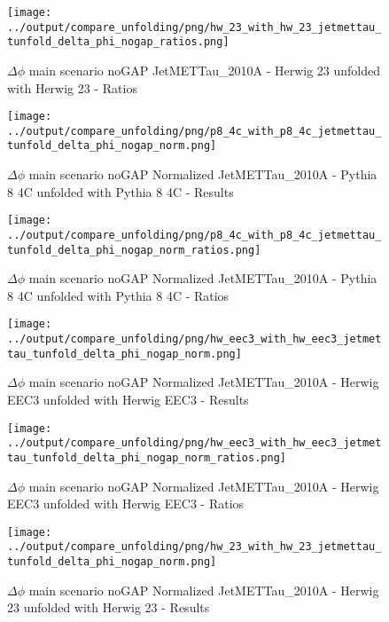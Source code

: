 \documentclass[11pt]{book}
\begin{document}
\begin{figure}[ht]
\centering
\texttt{[image: ../output/compare\_unfolding/png/hw\_23\_with\_hw\_23\_jetmettau\_tunfold\_delta\_phi\_nogap\_ratios.png]}
\caption{$\Delta\phi$ main scenario noGAP JetMETTau\_2010A - Herwig 23 unfolded with Herwig 23 - Ratios}
\label{hw_23_hw_23_jetmettau_tunfold_delta_phi_nogap_b}
\end{figure}



\begin{figure}[ht]
\centering
\texttt{[image: ../output/compare\_unfolding/png/p8\_4c\_with\_p8\_4c\_jetmettau\_tunfold\_delta\_phi\_nogap\_norm.png]}
\caption{$\Delta\phi$ main scenario noGAP Normalized JetMETTau\_2010A - Pythia 8 4C unfolded with Pythia 8 4C - Results}
\label{p8_p8_jetmettau_tunfold_delta_phi_nogap_norm_a}
\end{figure}

\begin{figure}[ht]
\centering
\texttt{[image: ../output/compare\_unfolding/png/p8\_4c\_with\_p8\_4c\_jetmettau\_tunfold\_delta\_phi\_nogap\_norm\_ratios.png]}
\caption{$\Delta\phi$ main scenario noGAP Normalized JetMETTau\_2010A - Pythia 8 4C unfolded with Pythia 8 4C - Ratios}
\label{p8_p8_jetmettau_tunfold_delta_phi_nogap_norm_b}
\end{figure}

\begin{figure}[ht]
\centering
\texttt{[image: ../output/compare\_unfolding/png/hw\_eec3\_with\_hw\_eec3\_jetmettau\_tunfold\_delta\_phi\_nogap\_norm.png]}
\caption{$\Delta\phi$ main scenario noGAP Normalized JetMETTau\_2010A - Herwig EEC3 unfolded with Herwig EEC3 - Results}
\label{hw_eec3_hw_eec3_jetmettau_tunfold_delta_phi_nogap_norm_a}
\end{figure}

\begin{figure}[ht]
\centering
\texttt{[image: ../output/compare\_unfolding/png/hw\_eec3\_with\_hw\_eec3\_jetmettau\_tunfold\_delta\_phi\_nogap\_norm\_ratios.png]}
\caption{$\Delta\phi$ main scenario noGAP Normalized JetMETTau\_2010A - Herwig EEC3 unfolded with Herwig EEC3 - Ratios}
\label{hw_eec3_hw_eec3_jetmettau_tunfold_delta_phi_nogap_norm_b}
\end{figure}

\begin{figure}[ht]
\centering
\texttt{[image: ../output/compare\_unfolding/png/hw\_23\_with\_hw\_23\_jetmettau\_tunfold\_delta\_phi\_nogap\_norm.png]}
\caption{$\Delta\phi$ main scenario noGAP Normalized JetMETTau\_2010A - Herwig 23 unfolded with Herwig 23 - Results}
\label{hw_23_hw_23_jetmettau_tunfold_delta_phi_nogap_norm_a}
\end{figure}
\end{document}
